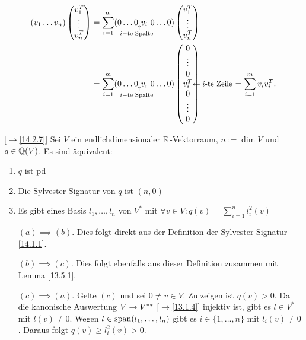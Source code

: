 \documentclass[../../main.tex]{subfiles}
\begin{document}
\begin{cproof}
    \begin{align*}
        (v_1\hdots v_n)\begin{pmatrix}v_1^T\\\vdots\\ v_n^T\end{pmatrix}&=\sum_{i=1}^m(0\hdots 0\ v_i\ 0\blap{\llap{$\begin{smallmatrix}\ \ \uparrow\\i-\text{te Spalte}\end{smallmatrix}$}}\hdots 0)\begin{pmatrix}v_1^T\\\vdots\\ v_n^T\end{pmatrix}\\
        &=\sum_{i=1}^m(0\hdots 0\ v_i\ 0\blap{\llap{$\begin{smallmatrix}\ \ \uparrow\\i-\text{te Spalte}\end{smallmatrix}$}}\hdots 0)\begin{pmatrix}0\\\vdots\\0\\v_i^T\rlap{\small$\leftarrow i$-te Zeile}\\0\\\vdots\\0\end{pmatrix}\qquad\qquad=\sum_{i=1}^m v_iv_i^T.
    \end{align*}
\end{cproof}

\begin{sat}\mbox{}[$\to$\ref{14.2.7}]\label{14.2.12}
    Sei $V$ ein endlichdimensionaler $\mathbb R$-Vektorraum, $n:=\dim V$ und $q\in \mathbb Q(V)$. Es sind äquivalent:
    \begin{enumerate}[\normalfont(a)]
        \item $q$ ist pd
        \item Die Sylvester-Signatur von $q$ ist $(n,0)$
        \item Es gibt eines Basis $l_1,\ldots ,l_n$ von $V^*$ mit $\forall v\in V: q(v)=\sum_{i=1}^n l_i^2(v)$
    \end{enumerate}
\end{sat}
\begin{cproof}
    \begin{itemize}
        \item[$(a)\implies (b)$.] Dies folgt direkt aus der Definition der Sylvester-Signatur \ref{14.1.1}.
        \item[$(b)\implies (c)$.] Dies folgt ebenfalls aus dieser Definition zusammen mit Lemma \ref{13.5.1}.
        \item[$(c)\implies (a)$.] Gelte $(c)$ und sei $0\neq v\in V$. Zu zeigen ist $q(v)>0$. Da die kanonische Auswertung $V\to V^{**}$ [$\to$\ref{13.1.4}] injektiv ist, gibt es $l\in V^*$ mit $l(v)\neq 0$. Wegen $l\in\operatorname{span}(l_1,\ldots ,l_n)$ gibt es $i\in\{1,\ldots ,n\}$ mit $l_i(v)\neq 0$. Daraus folgt $q(v)\ge l_i^2(v)>0$.
    \end{itemize}
\end{cproof}
\end{document}
